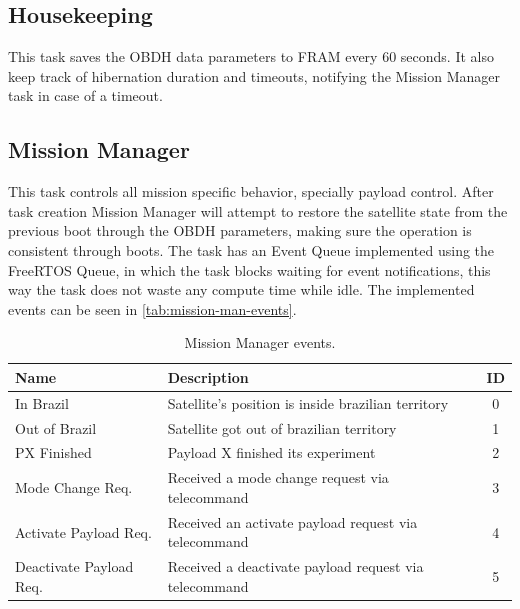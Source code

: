 \subsection{Housekeeping}

This task saves the OBDH data parameters to FRAM every 60 seconds. It also keep track of hibernation duration and timeouts, notifying the Mission Manager task in case of a timeout.

\subsection{Mission Manager}

This task controls all mission specific behavior, specially payload control. After task creation Mission Manager will attempt to restore the satellite state from the previous boot through the OBDH parameters, making sure the operation is consistent through boots. The task has an Event Queue implemented using the FreeRTOS Queue, in which the task blocks waiting for event notifications, this way the task does not waste any compute time while idle. The implemented events can be seen in \autoref{tab:mission-man-events}.

\begin{table}[!h]
	\centering
	\begin{tabular}{llc}
		\toprule[1.5pt]
		\textbf{Name}               & \textbf{Description}      & \textbf{ID}                                   \\
		\midrule
		In Brazil                   & Satellite's position is inside brazilian territory     & 0                 \\
		Out of Brazil               & Satellite got out of brazilian territory               & 1                 \\
		PX Finished                 & Payload X finished its experiment                      & 2                 \\
		Mode Change Req.            & Received a mode change request via telecommand         & 3                 \\
		Activate Payload Req.       & Received an activate payload request via telecommand   & 4                 \\
		Deactivate Payload Req.     & Received a deactivate payload request via telecommand  & 5                 \\
		\bottomrule[1.5pt]
	\end{tabular}
	\caption{Mission Manager events.}
	\label{tab:mission-man-events}
\end{table}

